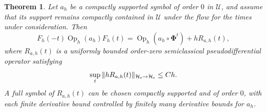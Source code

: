 \documentclass[11pt,reqno]{amsart}
\newtheorem{theorem}{Theorem}[section]
\newcommand{\Op}{\operatorname{Op}}
\numberwithin{equation}{section}
\begin{document}
\begin{theorem}\label{thm:egorov}
Let $a_h$ be a compactly supported symbol of order $0$ in $\mathcal U$, and assume that its support remains compactly contained in $\mathcal U$ under the flow for the times under consideration. Then
\begin{equation}\label{eq:egorov-with-class}
    F_h(-t)\Op_h(a_h)F_h(t)=\Op_h(a_h\circ\bm\Phi^t)+hR_{a,h}(t),
\end{equation}
where $R_{a,h}(t)$ is a uniformly bounded order-zero semiclassical pseudodifferential operator satisfying
\begin{equation*}
 \sup_t\|hR_{a,h}(t)\|_{\mathcal H_{\rm s}\to\mathcal H_{\rm s}}\le Ch.
\end{equation*}
A full symbol of $R_{a,h}(t)$ can be chosen compactly supported and of order $0$, with each finite derivative bound controlled by finitely many derivative bounds for $a_h$.
\end{theorem}
\end{document}
